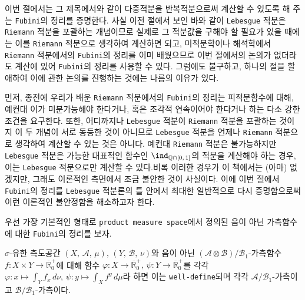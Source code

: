 이번 절에서는 그 제목에서와 같이 다중적분을 반복적분으로써 계산할 수 있도록 해 주는 \texttt{Fubini}의 정리를 증명한다. 사실 이전 절에서 보인 바와 같이 \texttt{Lebesgue} 적분은 \texttt{Riemann} 적분을 포괄하는 개념이므로 실제로 그 적분값을 구해야 할 필요가 있을 때에는 이를 \texttt{Riemann} 적분으로 생각하여 계산하면 되고, 미적분학이나 해석학에서 \texttt{Riemann} 적분에서의 \texttt{Fubini}의 정리를 이미 배웠으므로 이번 절에서의 논의가 없더라도 계산에 있어 \texttt{Fubini}의 정리를 사용할 수 있다. 그럼에도 불구하고, 하나의 절을 할애하여 이에 관한 논의를 진행하는 것에는 나름의 이유가 있다.

먼저, 종전에 우리가 배운 \texttt{Riemann} 적분에서의 \texttt{Fubini}의 정리는 피적분함수에 대해, 예컨대 이가 미분가능해야 한다거나, 혹은 조각적 연속이어야 한다거나 하는 다소 강한 조건을 요구한다. 또한, 어디까지나 \texttt{Lebesgue} 적분이 \texttt{Riemann} 적분을 포괄하는 것이지 이 두 개념이 서로 동등한 것이 아니므로 \texttt{Lebesgue} 적분을 언제나 \texttt{Riemann} 적분으로 생각하여 계산할 수 있는 것은 아니다. 예컨대 \texttt{Riemann} 적분은 불가능하지만 \texttt{Lebesgue} 적분은 가능한 대표적인 함수인 $\ind_{\mathbb{Q}\cap[0,\,1]}$의 적분을 계산해야 하는 경우, 이는 \texttt{Lebesgue} 적분으로만 계산할 수 있다.\footnotemark 비록 이러한 경우가 이 책에서는 (아마) 없겠지만, 그래도 이론적인 측면에서 조금 불안한 것이 사실이다. 이에 이번 절에서 \texttt{Fubini}의 정리를 \texttt{Lebesgue} 적분론의 틀 안에서 최대한 일반적으로 다시 증명함으로써 이런 이론적인 불안정함을 해소하고자 한다.

우선 가장 기본적인 형태로 \texttt{product measure space}에서 정의된 음이 아닌 가측함수에 대한 \texttt{Fubini}의 정리를 보자.

\begin{lemma}\label{lem:fubini1}
    $\sigma$-유한 측도공간 $(X,\,\mathcal{A},\,\mu),\,(Y,\,\mathcal{B},\,\nu)$와 음이 아닌 $(\mathcal{A}\otimes\mathcal{B})/\mathcal{B}_1$-가측함수 $f:X\times Y\to\overline{\mathbb{R}}^+_0$에 대해 함수 $\varphi:X\to\overline{\mathbb{R}}^+_0,\,\psi:Y\to\overline{\mathbb{R}}^+_0$를 각각 $\varphi:x\mapsto\int_Yf_x\,d\nu,\,\psi:y\mapsto\int_Xf^y\,d\mu$라 하면 이는 \texttt{well-define}되며 각각 $\mathcal{A}/\mathcal{B}_1$-가측이고 $\mathcal{B}/\mathcal{B}_1$-가측이다.
\end{lemma}

